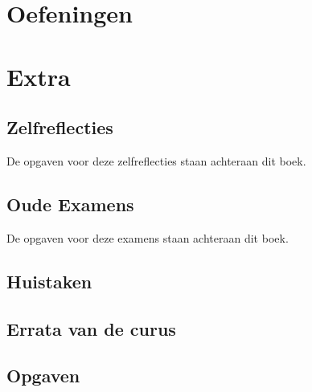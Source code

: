 \documentclass[a4paper,10pt,oneside]{book}
\begin{document}
\part{Oefeningen}







\part{Extra}






\chapter{Zelfreflecties}
De opgaven voor deze zelfreflecties staan achteraan dit boek.







\chapter{Oude Examens}
De opgaven voor deze examens staan achteraan dit boek.







\chapter{Huistaken}



\appendix
\chapter{Errata van de curus}


\chapter{Opgaven}












\end{document}
